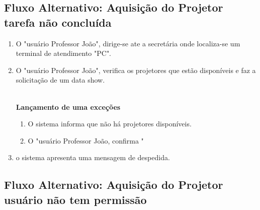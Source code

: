 \subsection{Fluxo Alternativo: Aquisição do Projetor tarefa não concluída}

\begin{enumerate}

  \item O "usuário Professor João", dirige-se ate a secretária onde localiza-se
    um terminal de atendimento "PC".

  \item O "usuário Professor João", verifica os projetores que estão disponíveis
    e faz a solicitação de um data show.

\\
  \textbf{Lançamento de uma exceções}
\\

    \begin{enumerate}

      \item O sistema informa que não há projetores disponíveis.
        
      \item O "usuário Professor João, confirma "

    \end{enumerate}
    
  \item o sistema apresenta uma mensagem de despedida. 
 

\end{enumerate}

\subsection{Fluxo Alternativo: Aquisição do Projetor usuário não tem permissão}

